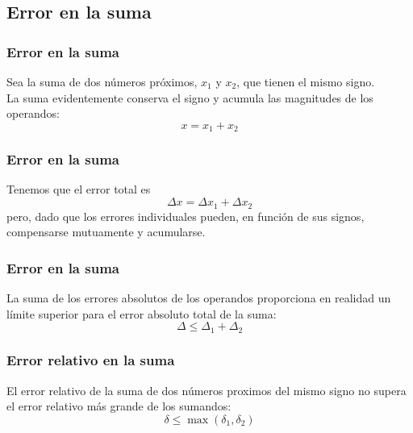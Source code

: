\subsection{Error en la suma}
\begin{frame}
\frametitle{Error en la suma}
Sea la suma de dos números próximos, $x_{1}$ y $x_{2}$, que tienen el mismo signo.
\\
\bigskip
La suma evidentemente conserva el signo y acumula las magnitudes de los operandos:
\begin{equation}
x = x_{1} + x_{2}
\label{eq:ecuacion_01_14}
\end{equation}
\end{frame}
\begin{frame}
\frametitle{Error en la suma}
Tenemos que el error total es
\[ \Delta x =  \Delta x_{1} + \Delta x_{2} \]
\pause
pero, dado que los errores individuales pueden, en función de sus signos, compensarse mutuamente y acumularse.
\end{frame}
\begin{frame}
\frametitle{Error en la suma}
La suma de los errores absolutos de los operandos proporciona en realidad un límite superior para el error absoluto total de la suma:
\begin{equation}
\Delta \leq \Delta_{1} + \Delta_{2}
\label{eq:ecuacion_01_15}
\end{equation}
\end{frame}
\begin{frame}
\frametitle{Error relativo en la suma}
El error relativo de la suma de dos números proximos del mismo signo no supera el error relativo más grande de los sumandos:
\begin{equation}
\delta \leq \max{(\delta_{1}, \delta_{2})}
\label{eq:ecuacion_01_16}
\end{equation}
\end{frame}
